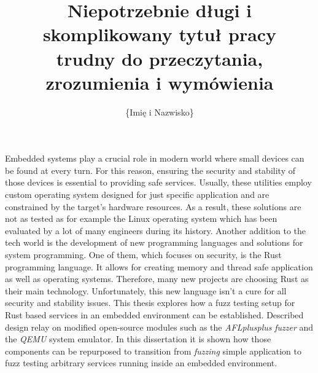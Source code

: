 \documentclass[
    bindingoffset=5mm,  %
    footnoteindent=3mm, %
    hyphenation=true    %
]{src/wut-thesis}
\begin{document}
\title{
    Niepotrzebnie długi i skomplikowany tytuł pracy \\
    trudny do przeczytania, zrozumienia i wymówienia
}
\author{\{Imię i Nazwisko\}}
\date{\the\year}
\maketitle

\cleardoublepage %
\abstract 
Embedded systems play a crucial role in modern world where small devices can be found at every turn. For this reason, ensuring the security and stability of those devices is essential to providing safe services. Usually, these utilities employ custom operating system designed for just specific application and are constrained by the target's hardware resources. As a result, these solutions are not as tested as for example the Linux operating system which has been evaluated by a lot of many engineers during its history. Another addition to the tech world is the development of new programming languages and solutions for system programming. One of them, which focuses on security, is the Rust programming language. It allows for creating memory and thread safe application as well as operating systems. Therefore, many new projects are choosing Rust as their main technology. Unfortunately, this new language isn't a cure for all security and stability issues. This thesis explores how a fuzz testing setup for Rust based services in an embedded environment can be established. Described design relay on modified open-source modules such as the \textit{AFLplusplus} \textit{fuzzer} and the \textit{QEMU} system emulator. In this dissertation it is shown how those components can be repurposed to transition from \textit{fuzzing} simple application to fuzz testing arbitrary services running inside an embedded environment. 
\end{document}
